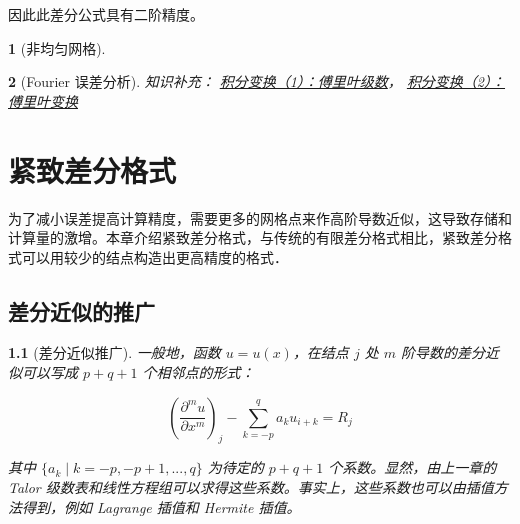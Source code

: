 \documentclass[zihao=5,UTF8]{report}
\theoremstyle{MyTheoremStyle} %
\theoremstyle{MySubsubsectionStyle} %
\newtheorem{definition}{}
\begin{document}
因此此差分公式具有二阶精度。


\begin{definition}[非均匀网格]



\end{definition}


\begin{definition}[Fourier 误差分析]

知识补充：
\href{https://zhuanlan.zhihu.com/p/108017728}{积分变换（1）：傅里叶级数}，
\href{https://zhuanlan.zhihu.com/p/108271985}{积分变换（2）：傅里叶变换}

\end{definition}

\chapter{紧致差分格式}

为了减小误差提高计算精度，需要更多的网格点来作高阶导数近似，这导致存储和计算量的激增。本章介绍紧致差分格式，与传统的有限差分格式相比，紧致差分格式可以用较少的结点构造出更高精度的格式．

\section{差分近似的推广}


\begin{definition}[差分近似推广]
一般地，函数 $u = u(x)$，在结点 $j$ 处 $m$ 阶导数的差分近似可以写成 $p+q+1$ 个相邻点的形式：

\begin{equation}
    \left(\frac{\partial^mu}{\partial x^m}\right)_j-\sum_{k=-p}^qa_ku_{i+k}=R_j
\end{equation}

其中 $\{a_k \mid  k = -p, -p + 1, ..., q\} $ 为待定的 $p+q+1$ 个系数。显然，由上一章的 Talor 级数表和线性方程组可以求得这些系数。事实上，这些系数也可以由插值方法得到，例如 Lagrange 插值和 Hermite 插值。
\end{definition}
\end{document}
